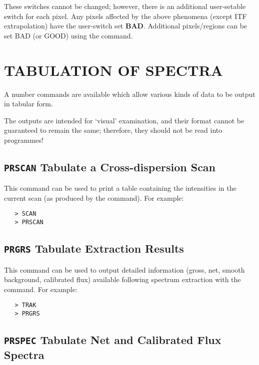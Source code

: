 These switches cannot be changed; however, there is an additional
user-setable  switch for each pixel.  Any pixels affected by the above
phenomena (except ITF extrapolation) have the user-switch set {\bf BAD}\@.
Additional pixels/regions can be set BAD (or GOOD) using the
 command.


\section{\label{se:tabular}TABULATION OF SPECTRA}

A number commands are available which allow various kinds of data to be output
in tabular form.

The outputs are intended for `visual' examination, and their format cannot be
guaranteed to remain the same; therefore, they should not be read into
programmes!


\subsection{{\tt PRSCAN} Tabulate a Cross-dispersion Scan}

This command can be used to print a table containing the intensities in the
current scan (as produced by the  command).
For example:

\begin{verbatim}
   > SCAN
   > PRSCAN
\end{verbatim}


\subsection{{\tt PRGRS} Tabulate Extraction Results}

This command can be used to output detailed information (gross, net, smooth
background, calibrated flux) available following spectrum extraction with the
 command.  For example:

\begin{verbatim}
   > TRAK
   > PRGRS
\end{verbatim}


\subsection{{\tt PRSPEC} Tabulate Net and Calibrated Flux Spectra}

